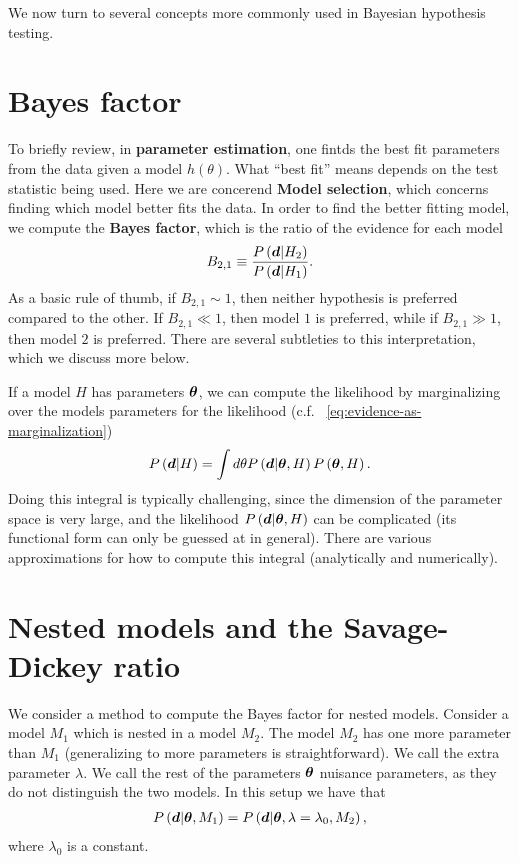 We now turn to several concepts more commonly used in Bayesian hypothesis testing.

\section{Bayes factor}


To briefly review, in \textbf{parameter estimation}, 
one fintds the best fit parameters from the data given a model $h\left(\theta\right)$.
What ``best fit'' means depends on the test statistic being used. 
Here we are concerend \textbf{Model selection}, which concerns finding which
model better fits the data.
In order to find the better fitting model, we compute the \textbf{Bayes factor},
which is the ratio of the evidence for each model 
\begin{align}
    \label{eq:def-Bayes-factor}
    B_{2,1}
    \equiv
    \frac{P\left({\bm d}|H_2\right)}{P\left({\bm d}|H_1\right)}
    .
\end{align}
As a basic rule of thumb, if $B_{2,1}\sim1$, then neither hypothesis is preferred
compared to the other.
If $B_{2,1}\ll1$, then model $1$ is preferred, while if $B_{2,1}\gg1$, then model $2$ is preferred.
There are several subtleties to this interpretation, which we discuss more below.

If a model $H$ has parameters ${\bm \theta}$, we can compute the likelihood 
by marginalizing over the models parameters for the likelihood
(c.f. ~\eqref{eq:evidence-as-marginalization})
\begin{align}
    P\left({\bm d}|H\right)
    =
    \int d\theta P\left({\bm d}|{\bm \theta},H\right) P\left({\bm \theta},H\right)
    .
\end{align}
Doing this integral is typically challenging, since the dimension of the
parameter space is very large, and the likelihood $P\left({\bm d}|{\bm \theta},H\right)$
can be complicated (its functional form can only be guessed at in general).
There are various approximations for how to 
compute this integral (analytically and numerically).

\section{Nested models and the Savage-Dickey ratio}

We consider a method to compute the Bayes factor for nested models. 
Consider a model $M_1$ which is nested in a model $M_2$.
The model $M_2$ has one more parameter than $M_1$ 
(generalizing to more parameters is straightforward).
We call the extra parameter $\lambda$.
We call the rest of the parameters ${\bm \theta}$ nuisance parameters,
as they do not distinguish the two models. 
In this setup we have that
\begin{align}
    P\left({\bm d}|{\bm \theta},M_1\right)
    =
    P\left({\bm d}|{\bm \theta},\lambda=\lambda_0,M_2\right)
    ,
\end{align}
where $\lambda_0$ is a constant.

